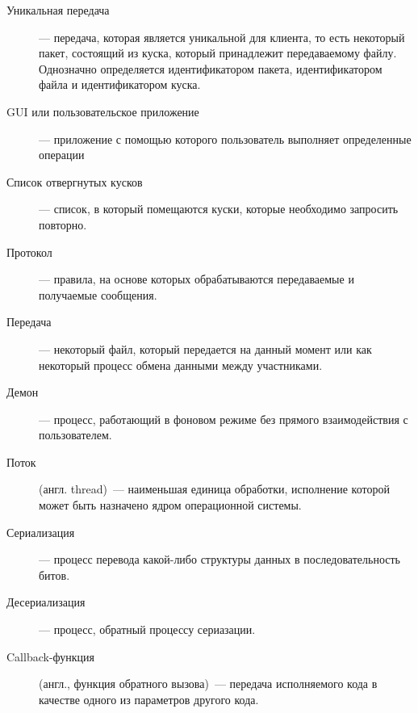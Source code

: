 \begin{description}
    \item[Уникальная передача]--- передача, которая является уникальной для клиента,
        то есть некоторый пакет, состоящий из куска, который принадлежит
        передаваемому файлу. Однозначно определяется идентификатором пакета,
        идентификатором файла и идентификатором куска.
    \item[GUI или пользовательское приложение]--- приложение с помощью которого
        пользователь выполняет определенные операции
    \item[Список отвергнутых кусков]--- список, в который помещаются куски,
        которые необходимо запросить повторно.
    \item[Протокол]--- правила, на основе которых обрабатываются передаваемые и
        получаемые сообщения.
    \item[Передача]--- некоторый файл, который передается на данный момент или как
        некоторый процесс обмена данными между участниками.
    \item[Демон]--- процесс, работающий в фоновом режиме без прямого взаимодействия с
        пользователем.
    \item[Поток] (англ. thread)~--- наименьшая единица обработки, исполнение которой может быть назначено ядром операционной системы.
    \item[Сериализация]--- процесс перевода какой-либо структуры данных в последовательность битов.
    \item[Десериализация]--- процесс, обратный процессу сериазации.
    \item[Callback-функция] (англ., функция обратного вызова)~--- передача исполняемого кода в качестве одного из параметров
        другого кода.
\end{description}
